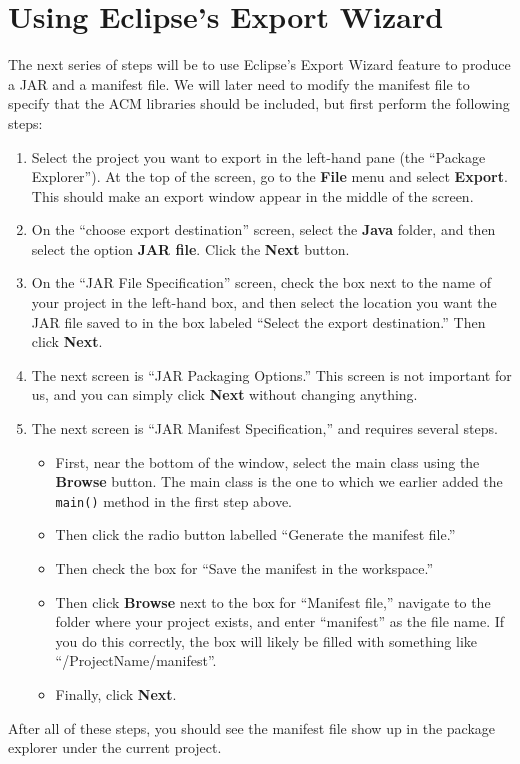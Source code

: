 \documentclass[11pt]{article}
\theoremstyle{plain}
\theoremstyle{definition}
\theoremstyle{remark}
\begin{document}
\section{Using Eclipse's Export Wizard}
The next series of steps will be to use Eclipse's Export Wizard feature to
produce a JAR and a manifest file. We will later need to modify the manifest
file to specify that the ACM libraries should be included, but first perform the
following steps:
\begin{enumerate}
  \item Select the project you want to export in the left-hand pane (the
    ``Package Explorer''). At the top of the screen, go to the {\bf File} menu
    and select {\bf Export}. This should make an export window appear in the
    middle of the screen.
  \item On the ``choose export destination'' screen, select the {\bf Java}
    folder, and then select the option {\bf JAR file}. Click the {\bf Next}
    button.
  \item On the ``JAR File Specification'' screen, check the box next to the name
    of your project in the left-hand box, and then select the location you want
    the JAR file saved to in the box labeled ``Select the export destination.''
    Then click {\bf Next}.
  \item The next screen is ``JAR Packaging Options.'' This screen is not
    important for us, and you can simply click {\bf Next} without changing
    anything.
  \item The next screen is ``JAR Manifest Specification,'' and requires several
    steps.
    \begin{itemize}
      \item First, near the bottom of the window, select the main class using
        the {\bf Browse} button.  The main class is the one to which we earlier
        added the {\tt main()} method in the first step above.
      \item Then click the radio button labelled ``Generate the manifest file.''
      \item Then check the box for ``Save the manifest in the workspace.''
      \item Then click {\bf Browse} next to the box for ``Manifest file,''
        navigate to the folder where your project exists, and enter ``manifest''
        as the file name. If you do this correctly, the box will likely be
        filled with something like ``/ProjectName/manifest''.
      \item Finally, click {\bf Next}.
    \end{itemize}
\end{enumerate}
After all of these steps, you should see the manifest file show up in the
package explorer under the current project.
\end{document}
